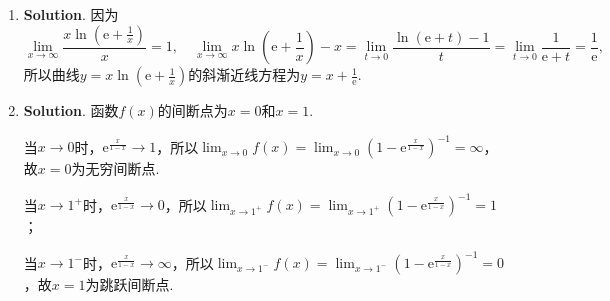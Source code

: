 \documentclass[../main.tex]{subfiles}
\begin{document}
\begin{enumerate}
          因此
          \[
              f^{(n)}(0)=(-1)^{n-1}\cdot n!\cdot 2^{n-1}.
          \]

    \item \textbf{Solution}. 因为
          \[
              \lim_{x\to\infty}\frac{x\ln\left(\mathrm{e}+\frac{1}{x}\right)}{x}
              =1,\quad\lim_{x\to\infty}x\ln\left(\mathrm{e}+\frac{1}{x}\right)-x=\lim_{t\to0}
              \frac{\ln(\mathrm{e}+t)-1}{t}=\lim_{t\to0}\frac{1}{\mathrm{e}+t}= \frac{1}{\mathrm{e}},
          \]
          所以曲线$y=x\ln\left(\mathrm{e}+\frac{1}{x}\right)$的斜渐近线方程为$y=x+\frac{1}{\mathrm{e}}$.

    \item \textbf{Solution}. 函数$f(x)$的间断点为$x=0$和$x=1$.

          当$x\to0$时，$\mathrm{e}^{\frac{x}{1-x}}\to1$，所以$\lim_{x\to0}f(x)=\lim_{x\to0}
              \left(1-\mathrm{e}^{\frac{x}{1-x}}\right)^{-1}=\infty$，故$x=0$为无穷间断点.

          当$x\to1^{+}$时，$\mathrm{e}^{\frac{x}{1-x}}\to0$，所以$\lim_{x\to1^+}f(x)=
              \lim_{x\to1^+}\left(1-\mathrm{e}^{\frac{x}{1-x}}\right)^{-1}=1$；

          当$x\to1^{-}$时，$\mathrm{e}^{\frac{x}{1-x}}\to\infty$，所以$\lim_{x\to1^-}
              f(x)=\lim_{x\to1^-}\left(1-\mathrm{e}^{\frac{x}{1-x}}\right)^{-1}=0$，故$x=
              1$为跳跃间断点.
\end{enumerate}
\end{document}
